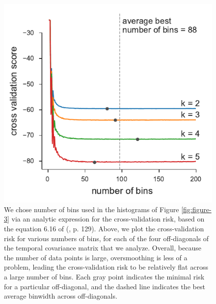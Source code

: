 \documentclass[11pt]{article}
\begin{document}
\begin{figure}[!ht]
  \centering
  \includegraphics[]{figures/barghi-cross-validation-binsize.pdf}

  \caption{We chose number of bins used in the histograms of Figure
    \ref{fig:figure-3} via an analytic expression for the cross-validation
    risk, based on the equation 6.16 of (\cite{Wasserman2006-jl}, p. 129).
    Above, we plot the cross-validation risk for various numbers of bins, for
    each of the four off-diagonals of the temporal covariance matrix that we
    analyze. Overall, because the number of data points is large, oversmoothing
    is less of a problem, leading the cross-validation risk to be relatively
    flat across a large number of bins. Each gray point indicates the minimal
    risk for a particular off-diagonal, and the dashed line indicates the best
    average binwidth across off-diagonals.}
  \label{suppfig:barghi-cross-validation-binsize}
\end{figure}
\end{document}
